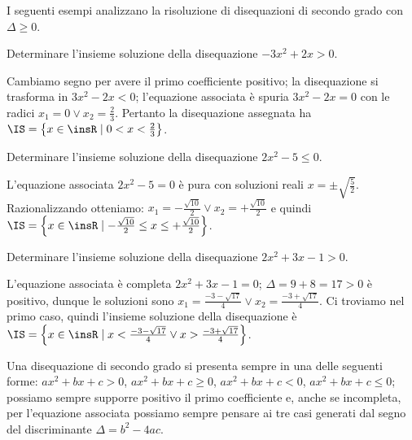 I seguenti esempi analizzano la risoluzione di disequazioni di secondo grado con $\Delta \ge 0$.
\begin{exrig}
\begin{esempio}
Determinare l'insieme soluzione della disequazione $-3x^2+2x>0$.

Cambiamo segno per avere il primo coefficiente positivo; la disequazione si trasforma in $3x^2-2x<0$; l'equazione associata è spuria $3x^2-2x=0$ con le radici $x_1=0\vee x_2=\frac 2 3$. Pertanto la disequazione assegnata ha $\IS=\left\{x\in \insR \mid 0<x<\frac 2 3\right\}$.
\end{esempio}

\begin{esempio}
Determinare l'insieme soluzione della disequazione $2x^2-5\le 0$.

L'equazione associata $2x^2-5=0$ è pura con soluzioni reali $x=\pm \sqrt{\frac 5 2}$. Razionalizzando otteniamo: $x_1=-\frac{\sqrt{10}} 2\vee x_2=+\frac{\sqrt{10}} 2$ e quindi $\IS=\left\{x\in \insR \mid -\frac{\sqrt{10}} 2\le x\le +\frac{\sqrt{10}} 2\right\}$.
\end{esempio}

\begin{esempio}
Determinare l'insieme soluzione della disequazione $2x^2+3x-1>0$.

L'equazione associata è completa $2x^2+3x-1=0$; $\Delta =9+8=17>0$ è positivo, dunque le soluzioni sono $x_1=\frac{-3-\sqrt{17}} 4\vee x_2=\frac{-3+\sqrt{17}} 4$. Ci troviamo nel primo caso, quindi l'insieme soluzione della disequazione è~$\IS=\left\{x\in \insR \mid x<\frac{-3-\sqrt{17}} 4\vee x>\frac{-3+\sqrt{17}} 4\right\}$.
%
\end{esempio}
\end{exrig}
\conclusione Una disequazione di secondo grado si presenta sempre in una delle seguenti forme: ${ax}^2+{bx}+c>0$, ${ax}^2+{bx}+c\ge 0$, ${ax}^2+{bx}+c<0$, ${ax}^2+{bx}+c\le 0$; possiamo sempre supporre positivo il primo coefficiente e, anche se incompleta, per l'equazione associata possiamo sempre pensare ai tre casi generati dal segno del discriminante $\Delta =b^2-4{ac}$.

